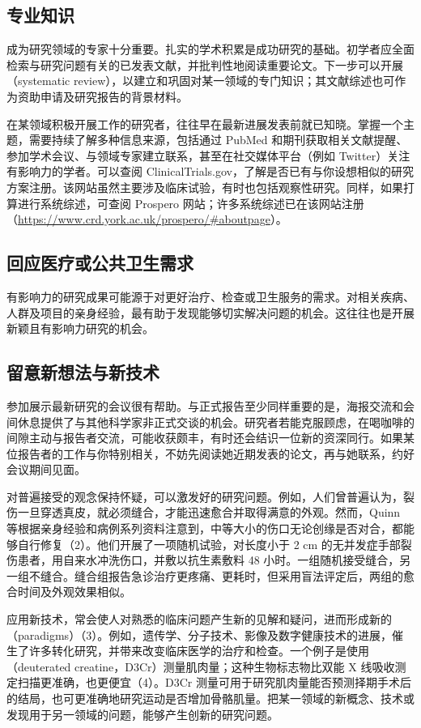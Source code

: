 \subsection{专业知识}
成为研究领域的专家十分重要。扎实的学术积累是成功研究的基础。初学者应全面检索与研究问题有关的已发表文献，并批判性地阅读重要论文。下一步可以开展（systematic review），以建立和巩固对某一领域的专门知识；其文献综述也可作为资助申请及研究报告的背景材料。

在某领域积极开展工作的研究者，往往早在最新进展发表前就已知晓。掌握一个主题，需要持续了解多种信息来源，包括通过 PubMed 和期刊获取相关文献提醒、参加学术会议、与领域专家建立联系，甚至在社交媒体平台（例如 Twitter）关注有影响力的学者。可以查阅 ClinicalTrials.gov，了解是否已有与你设想相似的研究方案注册。该网站虽然主要涉及临床试验，有时也包括观察性研究。同样，如果打算进行系统综述，可查阅 Prospero 网站；许多系统综述已在该网站注册（\url{https://www.crd.york.ac.uk/prospero/#aboutpage}）。

\subsection{回应医疗或公共卫生需求}
有影响力的研究成果可能源于对更好治疗、检查或卫生服务的需求。对相关疾病、人群及项目的亲身经验，最有助于发现能够切实解决问题的机会。这往往也是开展新颖且有影响力研究的机会。

\subsection{留意新想法与新技术}
参加展示最新研究的会议很有帮助。与正式报告至少同样重要的是，海报交流和会间休息提供了与其他科学家非正式交谈的机会。研究者若能克服顾虑，在喝咖啡的间隙主动与报告者交流，可能收获颇丰，有时还会结识一位新的资深同行。如果某位报告者的工作与你特别相关，不妨先阅读她近期发表的论文，再与她联系，约好会议期间见面。

对普遍接受的观念保持怀疑，可以激发好的研究问题。例如，人们曾普遍认为，裂伤一旦穿透真皮，就必须缝合，才能迅速愈合并取得满意的外观。然而，Quinn 等根据亲身经验和病例系列资料注意到，中等大小的伤口无论创缘是否对合，都能够自行修复（2）。他们开展了一项随机试验，对长度小于 2 cm 的无并发症手部裂伤患者，用自来水冲洗伤口，并敷以抗生素敷料 48 小时。一组随机接受缝合，另一组不缝合。缝合组报告急诊治疗更疼痛、更耗时，但采用盲法评定后，两组的愈合时间及外观效果相似。

应用新技术，常会使人对熟悉的临床问题产生新的见解和疑问，进而形成新的（paradigms）（3）。例如，遗传学、分子技术、影像及数字健康技术的进展，催生了许多转化研究，并带来改变临床医学的治疗和检查。一个例子是使用（deuterated creatine，D3Cr）测量肌肉量；这种生物标志物比双能 X 线吸收测定扫描更准确，也更便宜（4）。D3Cr 测量可用于研究肌肉量能否预测择期手术后的结局，也可更准确地研究运动是否增加骨骼肌量。把某一领域的新概念、技术或发现用于另一领域的问题，能够产生创新的研究问题。


